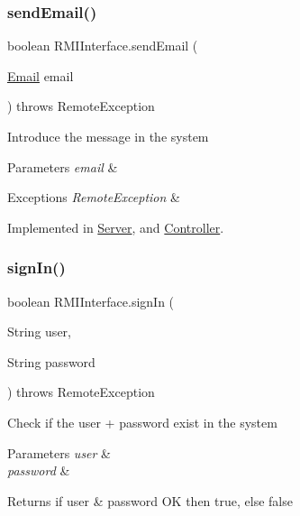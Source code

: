 \subsubsection{\texorpdfstring{send\+Email()}{sendEmail()}}
{\footnotesize\ttfamily boolean R\+M\+I\+Interface.\+send\+Email (\begin{DoxyParamCaption}\item[{\hyperlink{class_email}{Email}}]{email }\end{DoxyParamCaption}) throws Remote\+Exception}

Introduce the message in the system 
\begin{DoxyParams}{Parameters}
{\em email} & \\
\hline
\end{DoxyParams}

\begin{DoxyExceptions}{Exceptions}
{\em Remote\+Exception} & \\
\hline
\end{DoxyExceptions}


Implemented in \hyperlink{class_server_a4c26769f2867086519a196bc92502af6}{Server}, and \hyperlink{class_controller_a5f9217d932e5189ac91b54bde4136964}{Controller}.

\mbox{\label{interface_r_m_i_interface_a826db0ba8f0814985cfa911ef76a68cc}} 
\subsubsection{\texorpdfstring{sign\+In()}{signIn()}}
{\footnotesize\ttfamily boolean R\+M\+I\+Interface.\+sign\+In (\begin{DoxyParamCaption}\item[{String}]{user,  }\item[{String}]{password }\end{DoxyParamCaption}) throws Remote\+Exception}

Check if the user + password exist in the system 
\begin{DoxyParams}{Parameters}
{\em user} & \\
\hline
{\em password} & \\
\hline
\end{DoxyParams}
\begin{DoxyReturn}{Returns}
if user \& password OK then true, else false
\begin{DoxyItemize}
\item 
\end{DoxyItemize}
\end{DoxyReturn}

